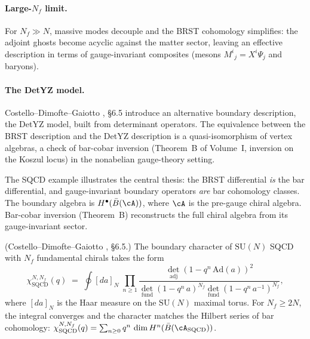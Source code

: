 \paragraph{Large-$N_f$ limit.}
For $N_f \gg N$, massive modes decouple and the BRST cohomology simplifies: the adjoint ghosts become acyclic against the matter sector, leaving an effective description in terms of gauge-invariant composites (mesons $M^i{}_j = X^i \Psi_j$ and baryons).

\paragraph{The DetYZ model.}
Costello--Dimofte--Gaiotto \cite{CDG2023}, \S6.5 introduce an alternative boundary description, the DetYZ model, built from determinant operators. The equivalence between the BRST description and the DetYZ description is a quasi-isomorphism of vertex algebras, a check of bar-cobar inversion (Theorem~B of Volume~I, inversion on the Koszul locus) in the nonabelian gauge-theory setting.

\begin{remark}
\label{rem:sqcd-bar-cobar}
The SQCD example illustrates the central thesis: the BRST differential
\emph{is} the bar differential, and gauge-invariant boundary operators
\emph{are} bar cohomology classes. The boundary algebra is $H^\bullet(\bar{B}(\cA))$, where $\cA$ is the pre-gauge chiral algebra. Bar-cobar inversion (Theorem~B) reconstructs the full chiral algebra from its gauge-invariant sector.
\end{remark}

\begin{example}
\label{ex:sqcd-characters}
\textup{(Costello--Dimofte--Gaiotto \cite{CDG2023}, \S6.5.)}
The boundary character of $\mathrm{SU}(N)$ SQCD with $N_f$
fundamental chirals takes the form
\begin{equation}\label{eq:sqcd-character}
 \chi_{\mathrm{SQCD}}^{N,N_f}(q)
 \;=\;
 \oint [da]_{N}\;
 \prod_{n \geq 1}
 \frac{\det_{\mathrm{adj}}(1 - q^n\,\mathrm{Ad}(a))^2}
 {\det_{\mathrm{fund}}(1-q^n\,a)^{N_f}
 \det_{\mathrm{fund}}(1-q^n\,a^{-1})^{N_f}},
\end{equation}
where $[da]_N$ is the Haar measure on the $\mathrm{SU}(N)$ maximal
torus. For $N_f \geq 2N$, the integral converges and the character
matches the Hilbert series of bar cohomology:
$\chi_{\mathrm{SQCD}}^{N,N_f}(q) = \sum_{n \geq 0} q^n\,\dim
H^n(\bar{B}(\cA_{\mathrm{SQCD}}))$.
\end{example}

